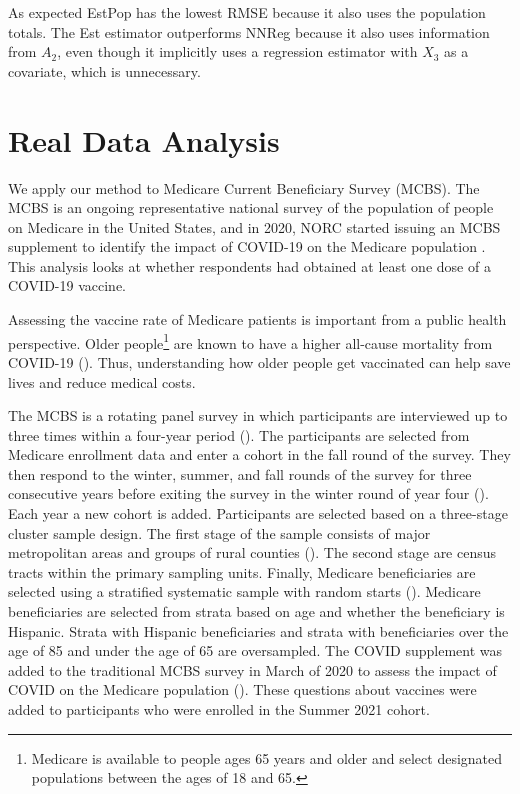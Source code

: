 \documentclass[12pt]{article}
\begin{document}
As expected EstPop has the lowest RMSE because it also uses the population
totals. The Est estimator outperforms
NNReg because it also uses information from $A_2$, even though it implicitly
uses a regression estimator with $X_3$ as a covariate, which is unnecessary.

\section{Real Data Analysis}

We apply our method to Medicare Current Beneficiary Survey (MCBS). The MCBS
is an ongoing representative national survey of the population of people on
Medicare in the United States, and in 2020, NORC started issuing an MCBS
supplement to identify the impact of COVID-19 on the Medicare population
\cite{norc2020mcbs}. This analysis looks at whether
respondents had obtained at least one dose of a COVID-19 vaccine.

Assessing the vaccine rate of Medicare patients is important from a public
health perspective. Older people\footnote{Medicare is available to people ages
65 years and older and select designated populations between the ages of 18 and
65.}
are known to have a higher all-cause mortality from
COVID-19 (\cite{bonanad2020effect}). Thus, understanding how older people get
vaccinated can help save lives and reduce medical costs.

The MCBS is a rotating panel survey in which participants are interviewed up to
three times within a four-year period (\cite{cms2021mcbs}). The participants
are selected from Medicare enrollment data and enter a cohort in the fall round
of the survey. They then respond to the winter, summer,
and fall rounds of the survey for three consecutive years before exiting the
survey in the winter round of year four (\cite{cms2021mcbs}). Each year a new
cohort is added. Participants are selected based on a three-stage cluster sample
design. The first stage of the sample consists of major metropolitan areas and
groups of rural counties (\cite{cms2021mcbs}). The second stage are census
tracts within the primary sampling units. Finally, Medicare beneficiaries are
selected using a stratified systematic sample with random starts 
(\cite{cms2021mcbs}). Medicare beneficiaries are selected from strata based on
age and whether the beneficiary is Hispanic. Strata with Hispanic beneficiaries
and strata with beneficiaries over the age of 85 and under the age of 65 are
oversampled.
The COVID supplement was added to the traditional MCBS survey in March of
2020 to assess the impact of COVID on the Medicare
population (\cite{cms2021covid}). These questions about vaccines were added to
participants who were enrolled in the Summer 2021 cohort.
\end{document}
